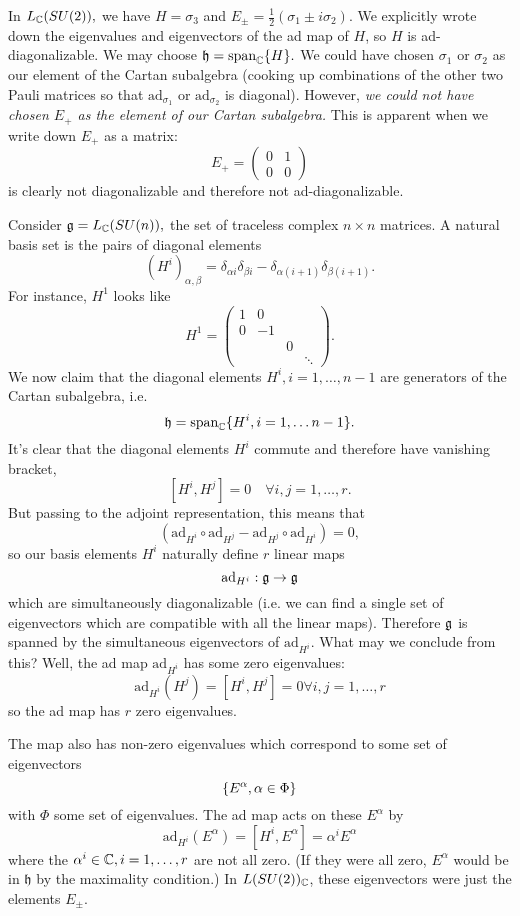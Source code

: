 \begin{exm}
In $L_{\mathbb{C}}(SU(2)),$ we have $H=\sigma_3$ and $E_{\pm}=\frac{1}{2}(\sigma_1\pm i\sigma_2)$. We explicitly wrote down the eigenvalues and eigenvectors of the ad map of $H$, so $H$ is ad-diagonalizable. We may choose
$\mathfrak{h}=\text{span}_{\mathbb{C}} \{H\}.$
We could have chosen $\sigma_1$ or $\sigma_2$ as our element of the Cartan subalgebra (cooking up combinations of the other two Pauli matrices so that $\text{ad}_{\sigma_1}$ or $\text{ad}_{\sigma_2}$ is diagonal). However, \emph{we could not have chosen $E_+$ as the element of our Cartan subalgebra.} This is apparent when we write down $E_+$ as a matrix:
$$E_+=\begin{pmatrix}
0&1\\0&0
\end{pmatrix}$$
is clearly not diagonalizable and therefore not ad-diagonalizable.
\end{exm}
\begin{exm}
Consider $\mathfrak{g}=L_{\mathbb{C}} (SU(n)),$ the set of traceless complex $n\times n$ matrices. A natural basis set is the pairs of diagonal elements
$$(H^i)_{\alpha,\beta}=\delta_{\alpha i} \delta_{\beta i}-\delta_{\alpha (i+1)}\delta_{\beta(i+1)}.$$
For instance, $H^1$ looks like
$$H^1=\begin{pmatrix}
1 & 0& &\\
0 & -1 & &\\
& & 0 &\\
& & & \ddots
\end{pmatrix}.$$
We now claim that the diagonal elements $H^i, i=1,\ldots, n-1$ are generators of the Cartan subalgebra, i.e.
$$\mathfrak{h}=\text{span}_{\mathbb{C}}\{H^i, i=1,\ldots n-1\}.$$
It's clear that the diagonal elements $H^i$ commute and therefore have vanishing bracket,
$$[H^i,H^j]=0 \quad \forall i,j=1,\ldots,r.$$
But passing to the adjoint representation, this means that
$$(\text{ad}_{H^i}\circ \text{ad}_{H^j} - \text{ad}_{H^j}\circ \text{ad}_{H^i})=0,$$
so our basis elements $H^i$ naturally define $r$ linear maps
$$\text{ad}_{H^i}:\mathfrak{g} \to \mathfrak{g}$$
which are simultaneously diagonalizable (i.e. we can find a single set of eigenvectors which are compatible with all the linear maps).
Therefore $\mathfrak{g}$ is spanned by the simultaneous eigenvectors of $\text{ad}_{H^i}.$ What may we conclude from this? Well, the ad map $\text{ad}_{H^i}$ has some zero eigenvalues:
$$\text{ad}_{H^i}(H^j)=[H^i,H^j]=0\forall i,j =1,\ldots,r$$
so the ad map has $r$ zero eigenvalues.

The map also has non-zero eigenvalues which correspond to some set of eigenvectors
$$\{E^\alpha, \alpha \in \Phi\}$$
with $\Phi$ some set of eigenvalues. The ad map acts on these $E^\alpha$ by
$$\text{ad}_{H^i}(E^\alpha)=[H^i, E^\alpha]=\alpha^i E^\alpha$$
where the $\alpha^i\in \mathbb{C}, i=1,\ldots, r$ are not all zero. (If they were all zero, $E^\alpha$ would be in $\mathfrak{h}$ by the maximality condition.) In $L(SU(2))_{\mathbb{C}}$, these eigenvectors were just the elements $E_\pm.$
\end{exm}
